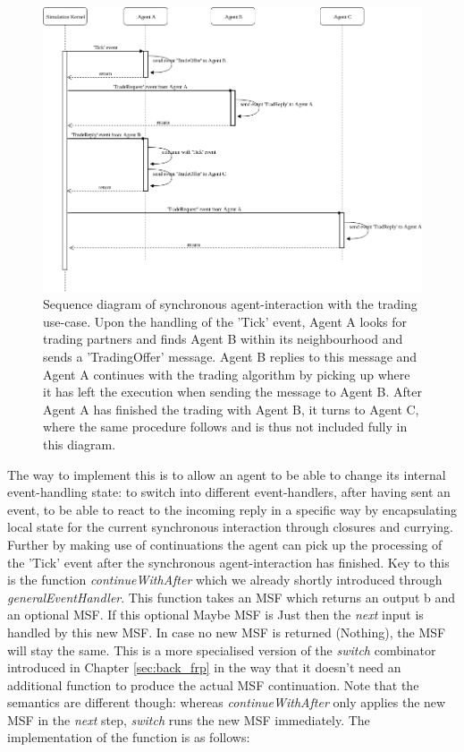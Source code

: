 \begin{figure}
	\centering
	\includegraphics[width=1.0\textwidth, angle=0]{./fig/eventdriven/syncagentinteractions.png}
	\caption{Sequence diagram of synchronous agent-interaction with the trading use-case. Upon the handling of the 'Tick' event, Agent A looks for trading partners and finds Agent B within its neighbourhood and sends a 'TradingOffer' message. Agent B replies to this message and Agent A continues with the trading algorithm by picking up where it has left the execution when sending the message to Agent B. After Agent A has finished the trading with Agent B, it turns to Agent C, where the same procedure follows and is thus not included fully in this diagram.}
	\label{fig:syncagentinteractions}
\end{figure}

The way to implement this is to allow an agent to be able to change its internal event-handling state: to switch into different event-handlers, after having sent an event, to be able to react to the incoming reply in a specific way by encapsulating local state for the current synchronous interaction through closures and currying. Further by making use of continuations the agent can pick up the processing of the 'Tick' event after the synchronous agent-interaction has finished. Key to this is the function \textit{continueWithAfter} which we already shortly introduced through \textit{generalEventHandler}. This function takes an MSF which returns an output b and an optional MSF. If this optional Maybe MSF is Just then the \textit{next} input is handled by this new MSF. In case no new MSF is returned (Nothing), the MSF will stay the same. This is a more specialised version of the \textit{switch} combinator introduced in Chapter \ref{sec:back_frp} in the way that it doesn't need an additional function to produce the actual MSF continuation. Note that the semantics are different though: whereas \textit{continueWithAfter} only applies the new MSF in the \textit{next} step, \textit{switch} runs the new MSF immediately. The implementation of the function is as follows:

